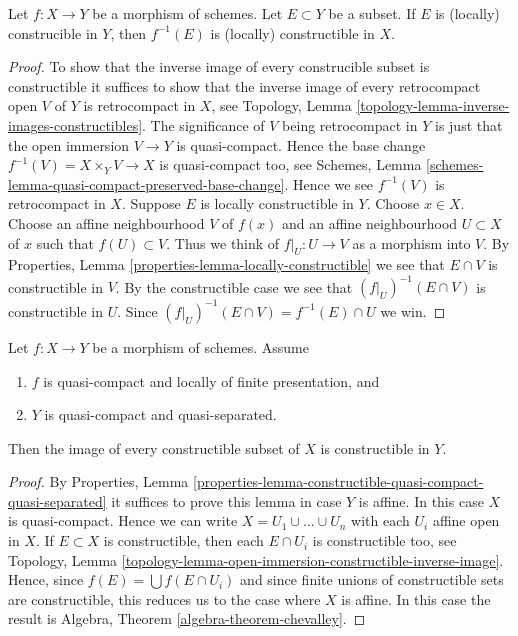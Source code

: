\begin{lemma}
\label{lemma-inverse-image-construcible}
Let $f : X \to Y$ be a morphism of schemes.
Let $E \subset Y$ be a subset.
If $E$ is (locally) construcible in $Y$, then $f^{-1}(E)$ is (locally)
constructible in $X$.
\end{lemma}

\begin{proof}
To show that the inverse image of every construcible subset is constructible
it suffices to show that the inverse image of every retrocompact open $V$
of $Y$ is retrocompact in $X$, see
Topology, Lemma \ref{topology-lemma-inverse-images-constructibles}.
The significance of $V$ being retrocompact
in $Y$ is just that the open immersion $V \to Y$ is quasi-compact.
Hence the base change $f^{-1}(V) = X \times_Y V \to X$ is quasi-compact
too, see
Schemes, Lemma \ref{schemes-lemma-quasi-compact-preserved-base-change}.
Hence we see $f^{-1}(V)$ is retrocompact in $X$.
Suppose $E$ is locally constructible in $Y$.
Choose $x \in X$. Choose an affine neighbourhood $V$ of $f(x)$ and
an affine neighbourhood $U \subset X$ of $x$ such that $f(U) \subset V$.
Thus we think of $f|_U : U \to V$ as a morphism into $V$. By
Properties, Lemma \ref{properties-lemma-locally-constructible}
we see that $E \cap V$ is constructible in $V$. By the constructible case
we see that $(f|_U)^{-1}(E \cap V)$ is constructible in $U$.
Since $(f|_U)^{-1}(E \cap V) = f^{-1}(E) \cap U$ we win.
\end{proof}

\begin{lemma}
\label{lemma-chevalley}
Let $f : X \to Y$ be a morphism of schemes.
Assume
\begin{enumerate}
\item $f$ is quasi-compact and locally of finite presentation, and
\item $Y$ is quasi-compact and quasi-separated.
\end{enumerate}
Then the image of every constructible subset of $X$ is constructible in $Y$.
\end{lemma}

\begin{proof}
By
Properties,
Lemma \ref{properties-lemma-constructible-quasi-compact-quasi-separated}
it suffices to prove this lemma in case $Y$ is affine.
In this case $X$ is quasi-compact. Hence we can write
$X = U_1 \cup \ldots \cup U_n$ with each $U_i$ affine open in $X$.
If $E \subset X$ is constructible, then each $E \cap U_i$ is constructible
too, see
Topology,
Lemma \ref{topology-lemma-open-immersion-constructible-inverse-image}.
Hence, since $f(E) = \bigcup f(E \cap U_i)$ and since finite unions of
constructible sets are constructible, this reduces us to the case where
$X$ is affine. In this case the result is
Algebra, Theorem \ref{algebra-theorem-chevalley}.
\end{proof}

